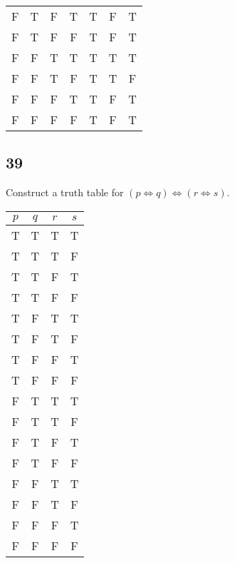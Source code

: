 \documentclass{article}
\begin{document}
\begin{tabular}{ | c | c | c | c | c | c | c | }
	F     & T     & F     & T     & T                               & F                                                         & T                                                                    \\
	F     & T     & F     & F     & T                               & F                                                         & T                                                                    \\
	F     & F     & T     & T     & T                               & T                                                         & T                                                                    \\
	F     & F     & T     & F     & T                               & T                                                         & F                                                                    \\
	F     & F     & F     & T     & T                               & F                                                         & T                                                                    \\
	F     & F     & F     & F     & T                               & F                                                         & T                                                                    \\
\end{tabular}

\subsection{39}

Construct a truth table for $ \left( p \iff q \right) \iff \left( r \iff s \right) $.

\begin{tabular}{ | c | c | c | c | }
	$ p $ & $ q $ & $ r $ & $ s $ \\
	\hline
	T     & T     & T     & T     \\
	T     & T     & T     & F     \\
	T     & T     & F     & T     \\
	T     & T     & F     & F     \\
	T     & F     & T     & T     \\
	T     & F     & T     & F     \\
	T     & F     & F     & T     \\
	T     & F     & F     & F     \\
	F     & T     & T     & T     \\
	F     & T     & T     & F     \\
	F     & T     & F     & T     \\
	F     & T     & F     & F     \\
	F     & F     & T     & T     \\
	F     & F     & T     & F     \\
	F     & F     & F     & T     \\
	F     & F     & F     & F     \\
\end{tabular}
\end{document}
